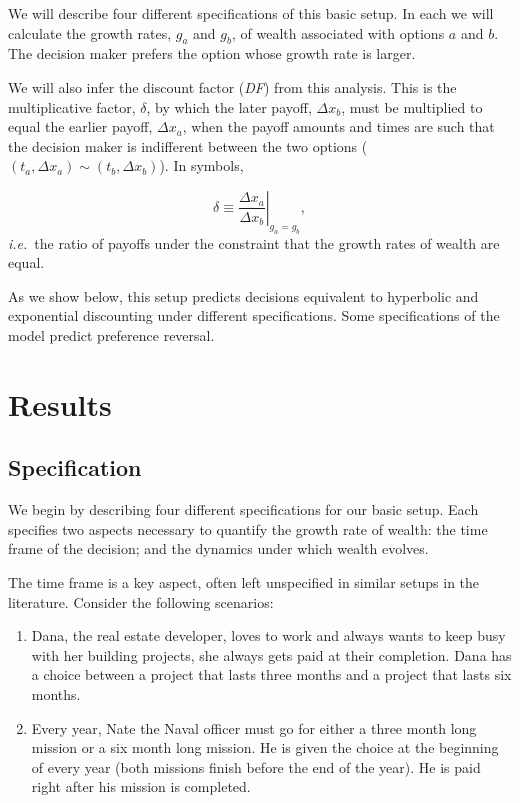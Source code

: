 \documentclass[11pt]{article}
\newcommand{\Sref}[1]{Section~\ref{sec:#1}}
\newcommand{\ie}{{\it i.e.}\ }
\newcommand{\be}{\begin{equation}}
\newcommand{\ee}{\end{equation}}
\newcommand{\Dx}{\Delta x}
\numberwithin{equation}{section}
\begin{document}
We will describe four different specifications of this basic setup. In each we will calculate the growth rates, $g_a$ and $g_b$, of wealth associated with options $a$ and $b$. The decision maker prefers the option whose growth rate is larger.

We will also infer the discount factor (\textit{DF}) from this analysis. This is the multiplicative factor, $\delta$, by which the later payoff, $\Dx_b$, must be multiplied to equal the earlier payoff, $\Dx_a$, when the payoff amounts and times are such that the decision maker is indifferent between the two options ($\left(t_a,\Dx_a\right) \sim \left(t_b,\Dx_b\right)$). In symbols,

\be
\delta \equiv \left.\frac{\Dx_a}{\Dx_b}\right|_{g_a=g_b},
\ee
\ie the ratio of payoffs under the constraint that the growth rates of wealth are equal.

As we show below, this setup predicts decisions equivalent to hyperbolic and exponential discounting under different specifications. Some specifications of the model predict preference reversal.

\section{Results}\label{sec:results}

\subsection{Specification}

We begin by describing four different specifications for our basic setup. Each specifies two aspects necessary to quantify the growth rate of wealth: the time frame of the decision; and the dynamics under which wealth evolves.

The time frame is a key aspect, often left unspecified in similar setups in the literature. Consider the following scenarios:

\begin{enumerate}
    \item Dana, the real estate developer, loves to work and always wants to keep busy with her building projects, she always gets paid at their completion. Dana has a choice between a project that lasts three months and a project that lasts six months. 
    \item Every year, Nate the Naval officer must go for either a three month long mission or a six month long mission. He is given the choice at the beginning of every year (both missions finish before the end of the year). He is paid right after his mission is completed.
\end{enumerate}
\end{document}

